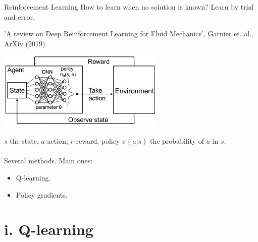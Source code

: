 \documentclass{beamer}
\begin{document}
\begin{frame}{Reinforcement Learning}
  How to learn when no solution is known? Learn by trial and error.

    \begin{center}
    'A review on Deep Reinforcement Learning for Fluid Mechanics', Garnier et. al., ArXiv (2019).
    \end{center}

  \begin{center}
      \includegraphics[width=0.6\textwidth]{./Figures/fig_DRL_policy.png}
  \end{center}

  $s$ the state, $a$ action, $r$ reward, policy $\pi(a | s)$ the probability of $a$ in $s$. \\~\\

   Several methods. Main ones:
   
   \begin{itemize}
     \item Q-learning.
     \item Policy gradients.
   \end{itemize}
\end{frame}

\section{i. Q-learning}
\end{document}
